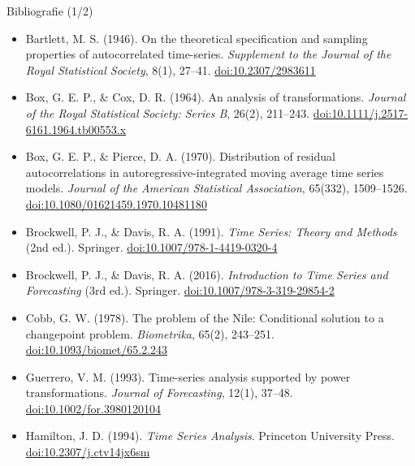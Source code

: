 \begin{frame}{Bibliografie (1/2)}
\itemsize{\scriptsize}
\begin{itemize}
    \item Bartlett, M. S. (1946). On the theoretical specification and sampling properties of autocorrelated time-series. \textit{Supplement to the Journal of the Royal Statistical Society}, 8(1), 27--41. \href{https://doi.org/10.2307/2983611}{doi:10.2307/2983611}
    \item Box, G. E. P., \& Cox, D. R. (1964). An analysis of transformations. \textit{Journal of the Royal Statistical Society: Series B}, 26(2), 211--243. \href{https://doi.org/10.1111/j.2517-6161.1964.tb00553.x}{doi:10.1111/j.2517-6161.1964.tb00553.x}
    \item Box, G. E. P., \& Pierce, D. A. (1970). Distribution of residual autocorrelations in autoregressive-integrated moving average time series models. \textit{Journal of the American Statistical Association}, 65(332), 1509--1526. \href{https://doi.org/10.1080/01621459.1970.10481180}{doi:10.1080/01621459.1970.10481180}
    \item Brockwell, P. J., \& Davis, R. A. (1991). \textit{Time Series: Theory and Methods} (2nd ed.). Springer. \href{https://doi.org/10.1007/978-1-4419-0320-4}{doi:10.1007/978-1-4419-0320-4}
    \item Brockwell, P. J., \& Davis, R. A. (2016). \textit{Introduction to Time Series and Forecasting} (3rd ed.). Springer. \href{https://doi.org/10.1007/978-3-319-29854-2}{doi:10.1007/978-3-319-29854-2}
    \item Cobb, G. W. (1978). The problem of the Nile: Conditional solution to a changepoint problem. \textit{Biometrika}, 65(2), 243--251. \href{https://doi.org/10.1093/biomet/65.2.243}{doi:10.1093/biomet/65.2.243}
    \item Guerrero, V. M. (1993). Time-series analysis supported by power transformations. \textit{Journal of Forecasting}, 12(1), 37--48. \href{https://doi.org/10.1002/for.3980120104}{doi:10.1002/for.3980120104}
    \item Hamilton, J. D. (1994). \textit{Time Series Analysis}. Princeton University Press. \href{https://doi.org/10.2307/j.ctv14jx6sm}{doi:10.2307/j.ctv14jx6sm}
\end{itemize}
\end{frame}

